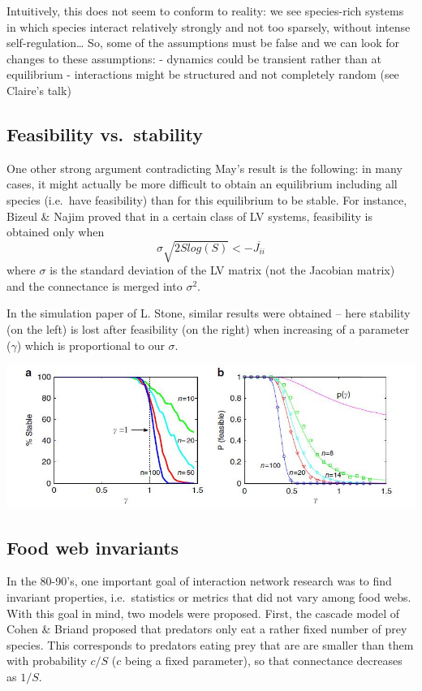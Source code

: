 \documentclass[
]{book}
\theoremstyle{definition}
\theoremstyle{definition}
\theoremstyle{definition}
\theoremstyle{definition}
\theoremstyle{remark}
\begin{document}
Intuitively, this does not seem to conform to reality: we see species-rich systems in which species interact relatively strongly and not too sparsely, without intense self-regulation\ldots{}
So, some of the assumptions must be false and we can look for changes to these assumptions:
- dynamics could be transient rather than at equilibrium
- interactions might be structured and not completely random (see Claire's talk)

\subsection{Feasibility vs.~stability}\label{feasibility-vs.-stability}

One other strong argument contradicting May's result is the following: in many cases, it might actually be more difficult to obtain an equilibrium including all species (i.e.~have feasibility) than for this equilibrium to be stable.
For instance, Bizeul \& Najim proved that in a certain class of LV systems, feasibility is obtained only when
\[\sigma \sqrt{2Slog(S)} < -\overline{J_{ii}}\]
where \(\sigma\) is the standard deviation of the LV matrix (not the Jacobian matrix) and the connectance is merged into \(\sigma^2\).

In the simulation paper of L. Stone, similar results were obtained -- here stability (on the left) is lost after feasibility (on the right) when increasing of a parameter (\(\gamma\)) which is proportional to our \(\sigma\).

\includegraphics[width=12.11in]{fig06Networks/Stone}

\subsection{Food web invariants}\label{food-web-invariants}

In the 80-90's, one important goal of interaction network research was to find invariant properties, i.e.~statistics or metrics that did not vary among food webs. With this goal in mind, two models were proposed.
First, the cascade model of Cohen \& Briand proposed that predators only eat a rather fixed number of prey species. This corresponds to predators eating prey that are are smaller than them with probability \(c/S\) (\(c\) being a fixed parameter), so that connectance decreases as \(1/S\).
\end{document}
